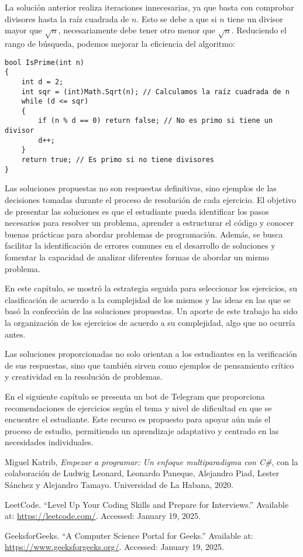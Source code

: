 \documentclass{article}
\begin{document}
La solución anterior realiza iteraciones innecesarias, ya que basta con comprobar divisores hasta la raíz cuadrada de \(n\). Esto se debe a que si \(n\) tiene un divisor mayor que \(\sqrt{n}\), necesariamente debe tener otro menor que \(\sqrt{n}\). Reduciendo el rango de búsqueda, podemos mejorar la eficiencia del algoritmo:

\begin{lstlisting}
bool IsPrime(int n)
{
    int d = 2;
    int sqr = (int)Math.Sqrt(n); // Calculamos la raíz cuadrada de n
    while (d <= sqr)
    {
        if (n % d == 0) return false; // No es primo si tiene un divisor
        d++;
    }
    return true; // Es primo si no tiene divisores
}
\end{lstlisting}

Las soluciones propuestas no son respuestas definitivas, sino ejemplos de las decisiones tomadas durante el proceso de resolución de cada ejercicio. El objetivo de presentar las soluciones es que el estudiante pueda identificar los pasos necesarios para resolver un problema, aprender a estructurar el código y conocer buenas prácticas para abordar problemas de programación. Además, se busca facilitar la identificación de errores comunes en el desarrollo de soluciones y fomentar la capacidad de analizar diferentes formas de abordar un mismo problema.

En este capítulo, se mostró la estrategia seguida para seleccionar los ejercicios, su clasificación de acuerdo a la complejidad de los mismos y las ideas en las que se basó la confección de las soluciones propuestas. Un aporte de este trabajo ha sido la organización de los ejercicios de acuerdo a su complejidad, algo que no ocurría antes.

Las soluciones proporcionadas no solo orientan a los estudiantes en la verificación de sus respuestas, sino que también sirven como ejemplos de pensamiento crítico y creatividad en la resolución de problemas.

En el siguiente capítulo se presenta un bot de Telegram que proporciona recomendaciones de ejercicios según el tema y nivel de dificultad en que se encuentre el estudiante. Este recurso es propuesto para apoyar aún más el proceso de estudio, permitiendo un aprendizaje adaptativo y centrado en las necesidades individuales.

\begin{thebibliography}{99}
Miguel Katrib, \textit{Empezar a programar: Un enfoque multiparadigma con C\#}, con la colaboración de Ludwig Leonard, Leonardo Paneque, Alejandro Piad, Lester Sánchez y Alejandro Tamayo. Universidad de La Habana, 2020.

LeetCode. ``Level Up Your Coding Skills and Prepare for Interviews.'' Available at: \url{https://leetcode.com/}. Accessed: January 19, 2025.

GeeksforGeeks. ``A Computer Science Portal for Geeks.'' Available at: \url{https://www.geeksforgeeks.org/}. Accessed: January 19, 2025.
\end{thebibliography}
\end{document}
